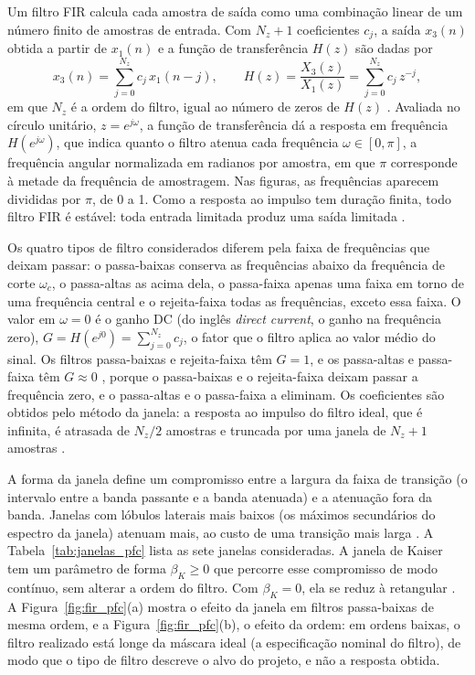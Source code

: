 \documentclass{pfccefsa}
\begin{document}
Um filtro FIR calcula cada amostra de saída como uma combinação linear de um
número finito de amostras de entrada. Com $N_z+1$ coeficientes $c_j$, a saída $x_3(n)$ obtida a partir de $x_1(n)$
e a função de transferência $H(z)$ são dadas por
\begin{equation}
  x_3(n)=\sum_{j=0}^{N_z} c_j\,x_1(n-j),
  \qquad
  H(z)=\frac{X_3(z)}{X_1(z)}=\sum_{j=0}^{N_z} c_j\,z^{-j},
  \label{eq:fir_pfc}
\end{equation}
em que $N_z$ é a ordem do filtro, igual ao número de zeros de $H(z)$
\cite{Oppenheim2009}. Avaliada no círculo unitário, $z=e^{j\omega}$, a função de
transferência dá a resposta em frequência $H(e^{j\omega})$, que indica quanto o
filtro atenua cada frequência $\omega\in[0,\pi]$, a frequência angular normalizada
em radianos por amostra, em que $\pi$ corresponde à metade da frequência de
amostragem. Nas figuras, as frequências aparecem divididas por $\pi$, de 0 a 1.
Como a resposta ao impulso tem duração finita, todo filtro FIR é estável: toda
entrada limitada produz uma saída limitada \cite{Oppenheim2009}.

Os quatro tipos de filtro considerados diferem pela faixa de frequências que
deixam passar: o passa-baixas conserva as frequências abaixo da frequência de
corte $\omega_c$, o passa-altas as acima dela, o passa-faixa apenas uma faixa em
torno de uma frequência central e o rejeita-faixa todas as frequências, exceto
essa faixa. O valor em $\omega=0$ é o ganho DC (do inglês \textit{direct
current}, o ganho na frequência zero), $G=H(e^{j0})=\sum_{j=0}^{N_z}c_j$, o
fator que o filtro aplica ao valor médio do sinal. Os filtros passa-baixas e
rejeita-faixa têm $G=1$, e os passa-altas e passa-faixa têm $G\approx0$
\cite{BorgesCNSNS2024}, porque o passa-baixas e o rejeita-faixa deixam passar a
frequência zero, e o passa-altas e o passa-faixa a eliminam. Os coeficientes são
obtidos pelo método da janela: a resposta ao
impulso do filtro ideal, que é infinita, é atrasada de $N_z/2$ amostras e
truncada por uma janela de $N_z+1$ amostras \cite{Oppenheim2009}.

A forma da janela define um compromisso entre a largura da faixa de transição
(o intervalo entre a banda passante e a banda atenuada) e a atenuação fora da
banda. Janelas com lóbulos laterais mais baixos (os máximos secundários do
espectro da janela) atenuam mais, ao custo de uma transição mais larga
\cite{Harris1978}. A
Tabela~\ref{tab:janelas_pfc} lista as sete janelas consideradas. A janela de
Kaiser tem um parâmetro de forma $\beta_K\ge0$ que percorre esse compromisso de
modo contínuo, sem alterar a ordem do filtro. Com $\beta_K=0$, ela se reduz à
retangular \cite{Kaiser1980}. A Figura~\ref{fig:fir_pfc}(a) mostra o efeito da
janela em filtros passa-baixas de mesma ordem, e a
Figura~\ref{fig:fir_pfc}(b), o efeito da ordem: em ordens baixas, o filtro
realizado está longe da máscara ideal (a especificação nominal do filtro), de
modo que o tipo de filtro descreve o
alvo do projeto, e não a resposta obtida.
\end{document}
